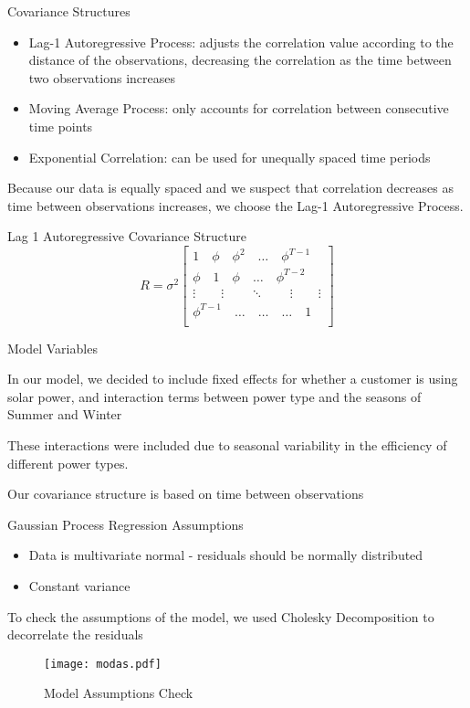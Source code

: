\documentclass[10pt]{beamer}
\begin{document}
\begin{frame}{Covariance Structures}
\begin{itemize}
\item Lag-1 Autoregressive Process: adjusts the correlation value according to the distance of the observations, decreasing the correlation as the time between two observations increases
\item Moving Average Process: only accounts for correlation between consecutive time points
\item Exponential Correlation: can be used for unequally spaced time periods
\end{itemize}
Because our data is equally spaced and we suspect that correlation decreases as time between observations increases, we choose the Lag-1 Autoregressive Process.
\end{frame}

\begin{frame}{Lag 1 Autoregressive}
Covariance Structure
\begin{equation}
R = \sigma^2
\begin{bmatrix} 
1 \quad \phi \quad \phi^2 \quad \hdots \quad \phi^{T-1} \\ 
\phi \quad 1 \quad \phi \quad \hdots \quad \phi^{T-2} \\ 
\vdots \quad \quad \vdots \quad \quad \ddots \quad \quad \vdots \quad \quad \vdots \\
\phi^{T-1} \quad \hdots \quad \hdots \quad \hdots \quad 1 \\
\end{bmatrix}
\end{equation}
\end{frame}

\begin{frame}{Model Variables}
\itemize
\item In our model, we decided to include fixed effects for whether a customer is using solar power, and interaction terms between power type and the seasons of Summer and Winter
\item These interactions were included due to seasonal variability in the efficiency of different power types.
\item Our covariance structure is based on time between observations
\end{frame}

\begin{frame}{Gaussian Process Regression Assumptions}
\begin{itemize}
\item Data is multivariate normal - residuals should be normally distributed
\item Constant variance
\end{itemize}
To check the assumptions of the model, we used Cholesky Decomposition to decorrelate the residuals
\begin{figure}
\begin{center}
\texttt{[image: modas.pdf]}
\smallskip
\caption{Model Assumptions Check}
\end{center}
\end{figure} 
\end{frame}
\end{document}
